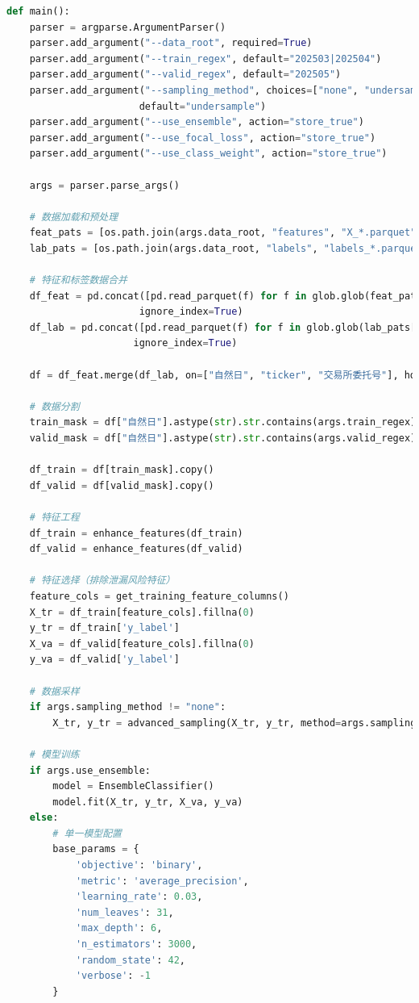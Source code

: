 \documentclass[12pt,a4paper]{article}
\begin{document}
\begin{lstlisting}[language=Python, caption=主训练脚本关键代码]
def main():
    parser = argparse.ArgumentParser()
    parser.add_argument("--data_root", required=True)
    parser.add_argument("--train_regex", default="202503|202504")
    parser.add_argument("--valid_regex", default="202505")
    parser.add_argument("--sampling_method", choices=["none", "undersample", "stratified_undersample"], 
                       default="undersample")
    parser.add_argument("--use_ensemble", action="store_true")
    parser.add_argument("--use_focal_loss", action="store_true")
    parser.add_argument("--use_class_weight", action="store_true")
    
    args = parser.parse_args()
    
    # 数据加载和预处理
    feat_pats = [os.path.join(args.data_root, "features", "X_*.parquet")]
    lab_pats = [os.path.join(args.data_root, "labels", "labels_*.parquet")]
    
    # 特征和标签数据合并
    df_feat = pd.concat([pd.read_parquet(f) for f in glob.glob(feat_pats[0])], 
                       ignore_index=True)
    df_lab = pd.concat([pd.read_parquet(f) for f in glob.glob(lab_pats[0])], 
                      ignore_index=True)
    
    df = df_feat.merge(df_lab, on=["自然日", "ticker", "交易所委托号"], how="inner")
    
    # 数据分割
    train_mask = df["自然日"].astype(str).str.contains(args.train_regex)
    valid_mask = df["自然日"].astype(str).str.contains(args.valid_regex)
    
    df_train = df[train_mask].copy()
    df_valid = df[valid_mask].copy()
    
    # 特征工程
    df_train = enhance_features(df_train)
    df_valid = enhance_features(df_valid)
    
    # 特征选择（排除泄漏风险特征）
    feature_cols = get_training_feature_columns()
    X_tr = df_train[feature_cols].fillna(0)
    y_tr = df_train['y_label']
    X_va = df_valid[feature_cols].fillna(0)
    y_va = df_valid['y_label']
    
    # 数据采样
    if args.sampling_method != "none":
        X_tr, y_tr = advanced_sampling(X_tr, y_tr, method=args.sampling_method)
    
    # 模型训练
    if args.use_ensemble:
        model = EnsembleClassifier()
        model.fit(X_tr, y_tr, X_va, y_va)
    else:
        # 单一模型配置
        base_params = {
            'objective': 'binary',
            'metric': 'average_precision',
            'learning_rate': 0.03,
            'num_leaves': 31,
            'max_depth': 6,
            'n_estimators': 3000,
            'random_state': 42,
            'verbose': -1
        }
        

\end{lstlisting}
\end{document}
